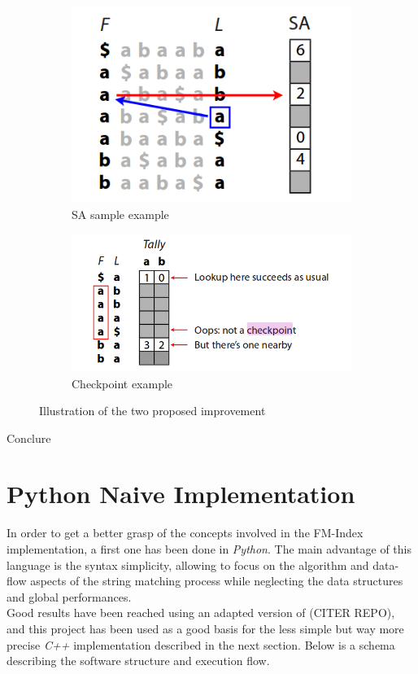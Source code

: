 		\begin{figure}[h]
			\centering
			\begin{subfigure}{.5\textwidth}
				\centering
				\includegraphics[width=.5\linewidth]{Figures/sa.png}
				\caption{SA sample example}
				\label{fig:sub1}
				\end{subfigure}%
				\begin{subfigure}{.5\textwidth}
					\centering
					\includegraphics[width=.8\linewidth]{Figures/CHECKPOINT.png}
					\caption{Checkpoint example}
					\label{fig:sub2}
					\end{subfigure}
					\caption{Illustration of the two proposed improvement}
					\label{fig:test}
					\end{figure}
					
					Conclure
					
									

\section{Python Naive Implementation}

In order to get a better grasp of the concepts involved in the FM-Index implementation, a first one has been done in \textsl{Python}. The main advantage of this language is the syntax simplicity, allowing to focus on the algorithm and data-flow aspects of the string matching process while neglecting the data structures and global performances. \\

Good results have been reached using an adapted version of (CITER REPO), and this project has been used as a good basis for the less simple but way more precise \textsl{C++} implementation described in the next section. Below is a schema describing the software structure and execution flow.

